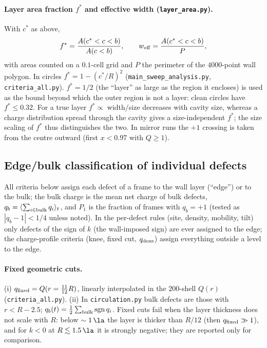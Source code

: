 \paragraph{Layer area fraction $f^*$ and effective width (\texttt{layer\_area.py}).}
With $c^*$ as above,
\begin{equation}
  f^* = \frac{A(c^*<c<b)}{A(c<b)},\qquad w_{\rm eff}=\frac{A(c^*<c<b)}{P},
\end{equation}
with areas counted on a $0.1$-cell grid and $P$ the perimeter of the $4000$-point wall polygon.
In circles $f^*=1-(c^*/R)^2$ (\texttt{main\_sweep\_analysis.py}, \texttt{criteria\_all.py}).
$f^*=1/2$ (the ``layer'' as large as the region it encloses) is used as the bound beyond which the
outer region is not a layer: clean circles have $f^*\le0.32$. For a true layer $f^*\propto$
width$/$size decreases with cavity size, whereas a charge distribution spread through the cavity
gives a size-independent $f^*$; the size scaling of $f^*$ thus distinguishes the two.
In mirror runs the $+1$ crossing is taken from the centre outward (first $x<0.97$ with $Q\ge1$).

\subsection{Edge/bulk classification of individual defects}
\label{sec:methods-criteria}

All criteria below assign each defect of a frame to the wall layer (``edge'') or to the bulk; the bulk
charge is the mean net charge of bulk defects, $q_b=\langle\sum_{i\in\rm bulk}q_i\rangle_t$, and
$P_1$ is the fraction of frames with $q_b=+1$ (tested as $|q_b-1|<1/4$ unless noted).
In the per-defect rules (site, density, mobility, tilt) only defects of the sign of $k$ (the wall-imposed sign) are
ever assigned to the edge; the charge-profile criteria (knee, fixed cut, $q_{\rm dens}$) assign everything outside a level to the edge.

\paragraph{Fixed geometric cuts.}
(i) $q_{\rm fixed}=Q(r=\tfrac{11}{12}R)$, linearly interpolated in the $200$-shell $Q(r)$
(\texttt{criteria\_all.py}). (ii) In \texttt{circulation.py} bulk defects are those with
$r<R-2.5$; $q_b(t)=\tfrac12\sum_{\rm bulk}\mathrm{sgn}\,q_i$. Fixed cuts fail when the layer thickness
does not scale with $R$: below $\sim1\,\la$ the layer is thicker than $R/12$ (then $q_{\rm fixed}\gg1$),
and for $k<0$ at $R\lesssim1.5\,\la$ it is strongly negative; they are reported only for comparison.

